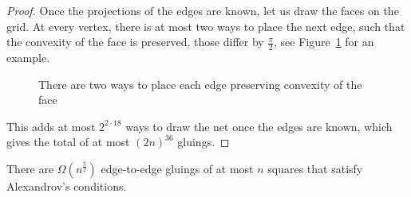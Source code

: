 \documentclass[a4paper,11pt]{article}
\begin{document}
\begin{proof}
Once the projections of the edges are known, let us draw the faces on the grid. At every vertex, there is at most two ways to place the next edge, such that the convexity of the face is preserved, those differ by $\frac{\pi}{2}$, see Figure~\ref{fig:twoWays} for an example.

\begin{figure}[h] \centering
{}
\caption{There are two ways to place each edge preserving convexity of the face}
\label{fig:twoWays}
\end{figure}

This adds at most $2^{2 \cdot 18}$ ways to draw the net once the edges are known, which gives the total of at most $(2n)^{36}$ gluings.
\end{proof}

\begin{theorem} \label{thm:n52}
	There are $\Omega \left( n^{\frac52} \right)$ edge-to-edge gluings of at most $n$ squares that satisfy Alexandrov's conditions.
\end{theorem}
\end{document}
